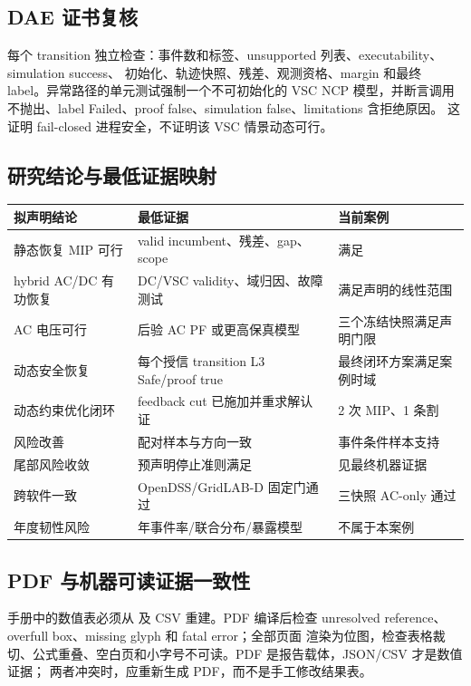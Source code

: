 \subsection{DAE 证书复核}

每个 transition 独立检查：事件数和标签、unsupported 列表、executability、simulation success、
初始化、轨迹快照、残差、观测资格、margin 和最终 label。异常路径的单元测试强制一个不可初始化的
VSC NCP 模型，并断言调用不抛出、label Failed、proof false、simulation false、limitations 含拒绝原因。
这证明 fail-closed 进程安全，不证明该 VSC 情景动态可行。

\subsection{研究结论与最低证据映射}

\begin{center}\small
\begin{tabular}{@{}L{4.0cm}L{5.0cm}L{4.2cm}@{}}
\toprule
拟声明结论 & 最低证据 & 当前案例\\\midrule
静态恢复 MIP 可行 & valid incumbent、残差、gap、scope & 满足\\
hybrid AC/DC 有功恢复 & DC/VSC validity、域归因、故障测试 & 满足声明的线性范围\\
AC 电压可行 & 后验 AC PF 或更高保真模型 & 三个冻结快照满足声明门限\\
动态安全恢复 & 每个授信 transition L3 Safe/proof true & 最终闭环方案满足案例时域\\
动态约束优化闭环 & feedback cut 已施加并重求解认证 & 2 次 MIP、1 条割\\
风险改善 & 配对样本与方向一致 & 事件条件样本支持\\
尾部风险收敛 & 预声明停止准则满足 & 见最终机器证据\\
跨软件一致 & OpenDSS/GridLAB-D 固定门通过 & 三快照 AC-only 通过\\
年度韧性风险 & 年事件率/联合分布/暴露模型 & 不属于本案例\\
\bottomrule
\end{tabular}
\end{center}

\subsection{PDF 与机器可读证据一致性}

手册中的数值表必须从 
及 CSV 重建。PDF 编译后检查 unresolved reference、overfull box、missing glyph 和 fatal error；全部页面
渲染为位图，检查表格裁切、公式重叠、空白页和小字号不可读。PDF 是报告载体，JSON/CSV 才是数值证据；
两者冲突时，应重新生成 PDF，而不是手工修改结果表。
